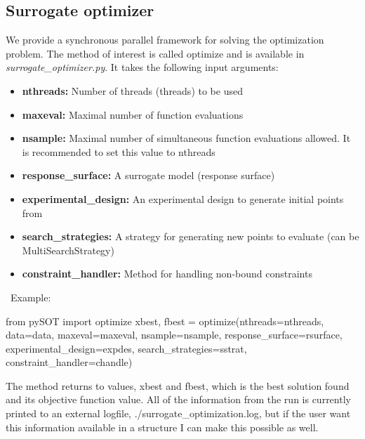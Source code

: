 \documentclass[]{article}
\begin{document}
\subsection{Surrogate optimizer} 
We provide a synchronous parallel framework for solving the optimization problem. The method of interest is called optimize and is available in \textit{surrogate\_optimizer.py}. It takes the following input arguments:
\begin{itemize}
\item \textbf{nthreads:} Number of threads (threads) to be used
\item \textbf{maxeval:} Maximal number of function evaluations
\item \textbf{nsample:} Maximal number of simultaneous function evaluations allowed. It is recommended to set this value to nthreads
\item \textbf{response\_surface:} A surrogate model (response surface)
\item \textbf{experimental\_design:} An experimental design to generate initial points from
\item \textbf{search\_strategies:} A strategy for generating new points to evaluate (can be MultiSearchStrategy)
\item \textbf{constraint\_handler:} Method for handling non-bound constraints
\end{itemize}
\ \newline Example: 
\begin{python}
from pySOT import optimize
xbest, fbest = optimize(nthreads=nthreads, data=data, maxeval=maxeval, 
			nsample=nsample, response_surface=rsurface,
                        experimental_design=expdes, search_strategies=sstrat, 
                        constraint_handler=chandle)
\end{python}
The method returns to values, xbest and fbest, which is the best solution found and its objective function value. All of the information from the run is currently printed to an external logfile, ./surrogate\_optimization.log, but if the user want this information available in a structure I can make this possible as well.
\end{document}
